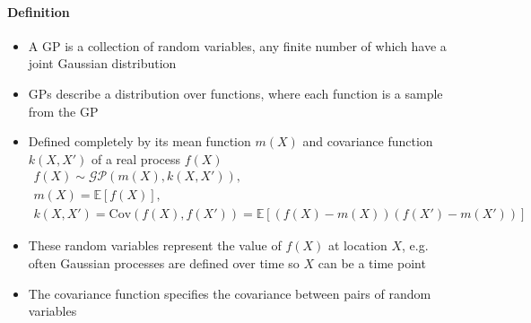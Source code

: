 \documentclass[12pt]{article}
\begin{document}
\paragraph{Definition}
\begin{itemize}
    \item A GP is a collection of random variables, any finite number of which have a joint Gaussian distribution
    \item GPs describe a distribution over functions, where each function is a sample from the GP
    \item Defined completely by its mean function $m(X)$ and covariance function $k(X,X')$ of a real process $f(X)$
\begin{equation}
    \begin{aligned}
        f(X) \sim \mathcal{GP}(m(X), k(X,X')), \\
        m(X) = \mathbb{E}[f(X)], \\
        k(X,X') = \text{Cov}(f(X), f(X')) = \mathbb{E}[(f(X) - m(X))(f(X') - m(X'))]
    \end{aligned}
\end{equation}
    \item These random variables represent the value of $f(X)$ at location $X$, e.g. often Gaussian processes are defined over time so $X$ can be a time point
    \item The covariance function specifies the covariance between pairs of random variables
\end{itemize}
\end{document}
